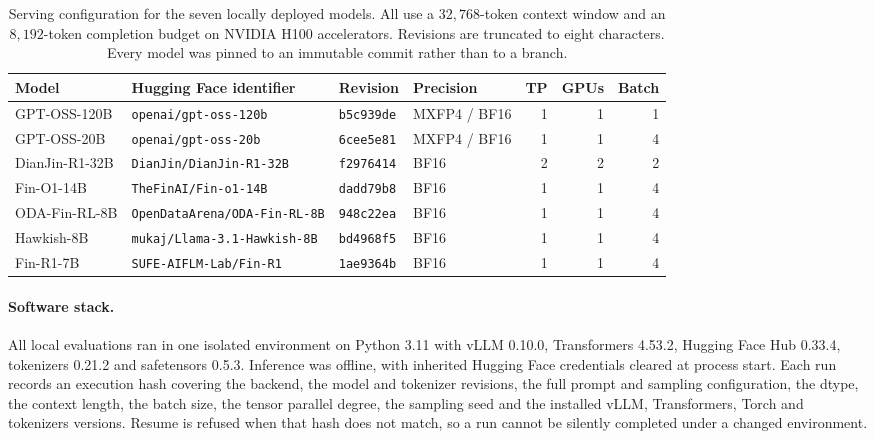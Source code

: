 \begin{table}[t]
\centering\small
\setlength{\tabcolsep}{4pt}
\begin{tabular}{llllrrr}
\toprule
\textbf{Model} & \textbf{Hugging Face identifier} & \textbf{Revision} & \textbf{Precision}
& \textbf{TP} & \textbf{GPUs} & \textbf{Batch} \\
\midrule
GPT-OSS-120B   & \texttt{openai/gpt-oss-120b}          & \texttt{b5c939de} & MXFP4 / BF16 & 1 & 1 & 1 \\
GPT-OSS-20B    & \texttt{openai/gpt-oss-20b}           & \texttt{6cee5e81} & MXFP4 / BF16 & 1 & 1 & 4 \\
\midrule
DianJin-R1-32B & \texttt{DianJin/DianJin-R1-32B}       & \texttt{f2976414} & BF16 & 2 & 2 & 2 \\
Fin-O1-14B     & \texttt{TheFinAI/Fin-o1-14B}          & \texttt{dadd79b8} & BF16 & 1 & 1 & 4 \\
ODA-Fin-RL-8B  & \texttt{OpenDataArena/ODA-Fin-RL-8B}  & \texttt{948c22ea} & BF16 & 1 & 1 & 4 \\
Hawkish-8B     & \texttt{mukaj/Llama-3.1-Hawkish-8B}   & \texttt{bd4968f5} & BF16 & 1 & 1 & 4 \\
Fin-R1-7B      & \texttt{SUFE-AIFLM-Lab/Fin-R1}        & \texttt{1ae9364b} & BF16 & 1 & 1 & 4 \\
\bottomrule
\end{tabular}
\caption{Serving configuration for the seven locally deployed models. All use a
$32{,}768$-token context window and an $8{,}192$-token completion budget on NVIDIA H100
accelerators. Revisions are truncated to eight characters. Every model was pinned to an
immutable commit rather than to a branch.}
\label{tab:local-config}
\end{table}

\paragraph{Software stack.}
All local evaluations ran in one isolated environment on Python 3.11 with vLLM 0.10.0,
Transformers 4.53.2, Hugging Face Hub 0.33.4, tokenizers 0.21.2 and safetensors 0.5.3.
Inference was offline, with inherited Hugging Face credentials cleared at process start. Each
run records an execution hash covering the backend, the model and tokenizer revisions, the full
prompt and sampling configuration, the dtype, the context length, the batch size, the tensor
parallel degree, the sampling seed and the installed vLLM, Transformers, Torch and tokenizers
versions. Resume is refused when that hash does not match, so a run cannot be silently completed
under a changed environment.

